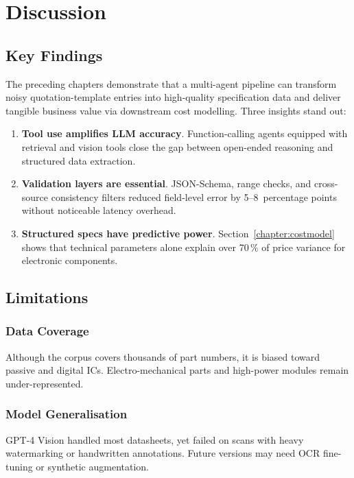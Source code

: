 \chapter{Discussion}
\label{chapter:discussion}

\section{Key Findings}
The preceding chapters demonstrate that a multi-agent pipeline can transform noisy quotation-template entries into high-quality specification data and deliver tangible business value via downstream cost modelling.  Three insights stand out:
\begin{enumerate}
  \item \textbf{Tool use amplifies LLM accuracy}. Function-calling agents equipped with retrieval and vision tools close the gap between open-ended reasoning and structured data extraction.
  \item \textbf{Validation layers are essential}. JSON-Schema, range checks, and cross-source consistency filters reduced field-level error by 5–8~percentage points without noticeable latency overhead.
  \item \textbf{Structured specs have predictive power}. Section~\ref{chapter:costmodel} shows that technical parameters alone explain over 70\,\% of price variance for electronic components.
\end{enumerate}

\section{Limitations}
\subsection{Data Coverage}
Although the corpus covers thousands of part numbers, it is biased toward passive and digital ICs.  Electro-mechanical parts and high-power modules remain under-represented.

\subsection{Model Generalisation}
GPT-4 Vision handled most datasheets, yet failed on scans with heavy watermarking or handwritten annotations.  Future versions may need OCR fine-tuning or synthetic augmentation.

